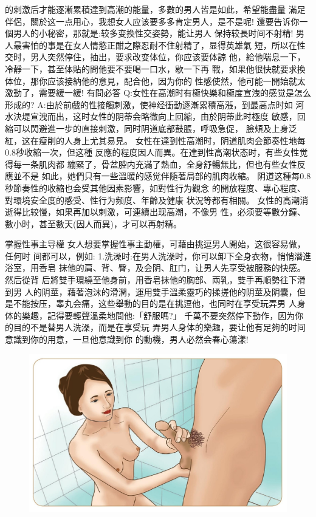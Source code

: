 \documentclass[12pt,UTF8]{ctexbook}
\begin{document}
的刺激后才能逐漸累積達到高潮的能量，多數的男人皆是如此，希望能盡量
滿足伴侶，關於这一点用心，我想女人应该要多多肯定男人，是不是呢!
還要告诉你一個男人的小秘密，那就是:较多变換性交姿勢，能让男人
保持较長时间不射精!
男人最害怕的事是在女人情慾正酣之際忍耐不住射精了，显得英雄氣
短，所以在性交时，男人突然停住，抽出，要求改变体位，你应该要体諒
他，給他喘息一下，冷靜一下，甚至体貼的問他要不要喝一口水，歇一下再
戰，如果他很快就要求換体位，那你应该接納他的意見，配合他，因为你的
性感使然，他可能一開始就太激動了，需要緩一緩!
有問必答
Q:女性在高潮时有極快樂和極度宣洩的感觉是怎么形成的?
A:由於前戲的性接觸刺激，使神经衝動逐漸累積高漲，到最高点时如
河水決堤宣洩而出，这时女性的阴蒂会略微向上回縮，由於阴蒂此时極度
敏感，回縮可以閃避進一步的直接刺激，同时阴道底部鼓脹，呼吸急促，
臉頰及上身泛紅，这在瘦削的人身上尤其易見。
女性在達到性高潮时，阴道肌肉会節奏性地每0.8秒收縮一次，但这種
反應的程度因人而異。在達到性高潮状态时，有些女性觉得每一条肌肉都
繃緊了，骨盆腔内充滿了熱血，全身舒暢無比，但也有些女性反應並不是
如此，她們只有一些溫暖的感觉伴隨著局部的肌肉收縮。
阴道这種每0.8秒節奏性的收縮也会受其他因素影響，如對性行为觀念
的開放程度、專心程度、對環境安全度的感受、性行为频度、年齡及健康
状況等都有相關。
女性的高潮消逝得比较慢，如果再加以刺激，可連續出现高潮，不像男
性，必须要等數分鐘、數小时，甚至數天(因人而異)，才可以再射精。

掌握性事主导權
女人想要掌握性事主動權，可藉由挑逗男人開始，这很容易做，任何时
间都可以，例如:
1.洗澡时:在男人洗澡时，你可以卸下全身衣物，悄悄潛進浴室，用香皂
抹他的肩、背、臀，及会阴、肛门，让男人先享受被服務的快感。然后從背
后將雙手環繞至他身前，用香皂抹他的胸部、兩乳，雙手再順勢往下滑到男
人的阴莖，藉著泡沫的滑潤，運用雙手溫柔靈巧的揉搓他的阴莖及阴囊，但
是不能按压，睾丸会痛，这些舉動的目的是在挑逗他，也同时在享受玩弄男
人身体的樂趣，記得要輕聲溫柔地問他:「舒服嗎?」
千萬不要突然停下動作，因为你的目的不是替男人洗澡，而是在享受玩
弄男人身体的樂趣，要让他有足夠的时间意識到你的用意，一旦他意識到你
的動機，男人必然会春心蕩漾!

\begin{figure}[htbp]
	\centering
	\includegraphics[width=0.7\linewidth]{14}
	\caption{}
	\label{fig:1}
\end{figure}
\end{document}
